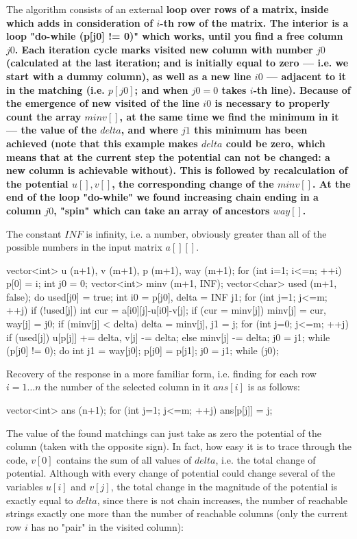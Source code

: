 The algorithm consists of an external \bf{loop over rows of a matrix}, inside which adds in consideration of $i$-th row of the matrix. The interior is a loop "do-while (p[j0] != 0)" which works, until you find a free column $j0$. Each iteration cycle marks visited new column with number $j0$ (calculated at the last iteration; and is initially equal to zero --- i.e. we start with a dummy column), as well as a new line $i0$ --- adjacent to it in the matching (i.e. $p[j0]$; and when $j0=0$ takes $i$-th line). Because of the emergence of new visited of the line $i0$ is necessary to properly count the array $minv[]$, at the same time we find the minimum in it --- the value of the $delta$, and where $j1$ this minimum has been achieved (note that this example makes $delta$ could be zero, which means that at the current step the potential can not be changed: a new column is achievable without). This is followed by recalculation of the potential $u[], v[]$, the corresponding change of the $minv[]$. At the end of the loop "do-while" we found increasing chain ending in a column $j0$, "spin" which can take an array of ancestors $way[]$.

The constant $INF$ is infinity, i.e. a number, obviously greater than all of the possible numbers in the input matrix $a[][]$.

\code
vector<int> u (n+1), v (m+1), p (m+1), way (m+1);
for (int i=1; i<=n; ++i) {
p[0] = i;
int j0 = 0;
vector<int> minv (m+1, INF);
vector<char> used (m+1, false);
do {
used[j0] = true;
int i0 = p[j0], delta = INF j1;
for (int j=1; j<=m; ++j)
if (!used[j]) {
int cur = a[i0][j]-u[i0]-v[j];
if (cur = minv[j])
minv[j] = cur, way[j] = j0;
if (minv[j] < delta)
delta = minv[j], j1 = j;
}
for (int j=0; j<=m; ++j)
if (used[j])
u[p[j]] += delta, v[j] -= delta;
else
minv[j] -= delta;
j0 = j1;
} while (p[j0] != 0);
do {
int j1 = way[j0];
p[j0] = p[j1];
j0 = j1;
} while (j0);
}
\endcode

Recovery of the response in a more familiar form, i.e. finding for each row $i = 1 \ldots n$ the number of the selected column in it $ans[i]$ is as follows:

\code
vector<int> ans (n+1);
for (int j=1; j<=m; ++j)
ans[p[j]] = j;
\endcode

The value of the found matchings can just take as zero the potential of the column (taken with the opposite sign). In fact, how easy it is to trace through the code, $v[0]$ contains the sum of all values of $delta$, i.e. the total change of potential. Although with every change of potential could change several of the variables $u[i]$ and $v[j]$, the total change in the magnitude of the potential is exactly equal to $delta$, since there is not chain increases, the number of reachable strings exactly one more than the number of reachable columns (only the current row $i$ has no "pair" in the visited column):


